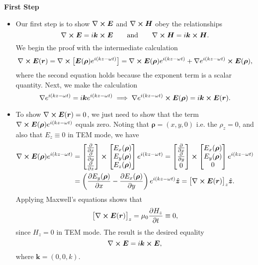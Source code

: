 \documentclass[11pt, a4paper]{article}
\newcommand{\eqtext}[1]{\qquad \text{#1} \qquad}
\renewcommand{\vec}[1]{\bm{#1}} %
\newcommand{\uvec}[1]{\hat{\vec{#1}}} %
\renewcommand{\r}{\vec{r}}
\newcommand{\rh}{\vec{\rho}}
\newcommand{\E}{\vec{E}}  %
\renewcommand{\H}{\vec{H}}  %
\newcommand{\mm}{\mu_{0}}  %
\newcommand{\m}{\vec{m}}  %
\renewcommand{\curl}{\nabla \cross}
\renewcommand{\grad}{\nabla}
\begin{document}
\textbf{First Step}
\begin{itemize}
    \item Our first step is to show $ \curl \E $ and $ \curl \H $ obey the relationships
	\begin{equation*}
		\curl \E = i \vec{k} \cross \E \eqtext{and} \curl \H = i \vec{k} \cross \H.
	\end{equation*}
	We begin the proof with the intermediate calculation
	\begin{equation*}
		\curl \E(\r) = \curl \big[\E(\vec{\rh}) e^{i(kz - \omega t)}\big] = \curl \E(\rh) e^{i(kz - \omega t)} + \grad e^{i(kz - \omega t)} \cross  \E(\vec{\rh}),
	\end{equation*}
	where the second equation holds because the exponent term is a scalar quantity. Next, we make the calculation
	\begin{equation*}
		\grad e^{i(kz - \omega t)}  = i\vec{k}e^{i(kz - \omega t)}  \implies \grad e^{i(kz - \omega t)} \cross  \E(\vec{\rh}) = i \vec{k} \cross \E(\r).
	\end{equation*}
    
    \item To show $ \curl \E(\r) = 0 $, we just need to show that the term $ \curl \E(\rh) e^{i(kz - \omega t)} $ equals zero. Noting that $ \rh = (x, y, 0) $ i.e. the $ \rho_{z} = 0 $, and also that $ E_{z} \equiv 0 $ in TEM mode, we have
	\begin{align*}
		\curl \E(\rh)e^{i(kz - \omega t)} &= 
		\begin{bmatrix}
		\pdv{x}\\
		\pdv{y}\\
		\pdv{z}
		\end{bmatrix}
		\cross 
		\begin{bmatrix}
		E_{x}(\rh)\\
		E_{y}(\rh)\\
		E_{z}(\rh)
		\end{bmatrix}
		e^{i(kz - \omega t)}
		= 
		\begin{bmatrix}
		\pdv{x}\\
		\pdv{y}\\
		0	
		\end{bmatrix}
		\cross 
		\begin{bmatrix}
		E_{x}(\rh)\\
		E_{y}(\rh)\\
		0
		\end{bmatrix}
		e^{i(kz - \omega t)}\\
		&
		= \left(\pdv{E_{y}(\rh)}{x} - \pdv{E_{x}(\rh)}{y}\right)e^{i(kz - \omega t)}\uvec{z} = \big[\curl \E(\r)\big]_{z} \uvec{z}.
	\end{align*}
	Applying Maxwell's equations shows that
	\begin{equation*}
		\big[\curl \E(\r)\big]_{z} = \mm \pdv{H_{z}}{t} \equiv 0,
	\end{equation*}
	since $ H_{z} = 0 $ in TEM mode. The result is the desired equality
	\begin{equation*}
		\curl \E = i \vec{k} \cross \E,
	\end{equation*}
	where $ \vec{k} = (0, 0, k) $. 
	

\end{itemize}
\end{document}
